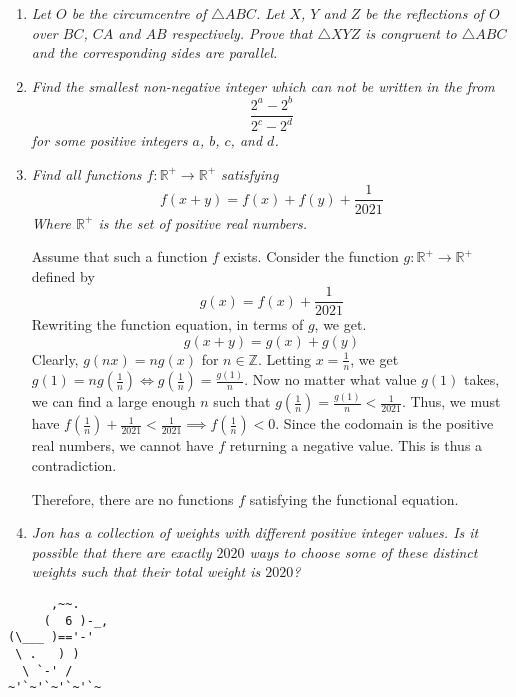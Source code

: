 \documentclass{article}
\begin{document}
\begin{enumerate}[1.]
\item %
{\itshape Let $O$ be the circumcentre of $\triangle ABC$. Let $X$, $Y$ and $Z$ be the reflections of $O$ over $BC$, $CA$ and $AB$ respectively. Prove that $\triangle XYZ$ is congruent to $\triangle ABC$ and the corresponding sides are parallel.}


\item %
{\itshape Find the smallest non-negative integer which can not be written in the from
\[
  \frac{2^a - 2^b}{2^c - 2^d}
\]
for some positive integers $a$, $b$, $c$, and $d$.}


\item %
{\itshape Find all functions $f: \mathbb{R}^+ \rightarrow \mathbb{R}^+$ satisfying 
$$f(x + y) = f(x) + f(y) + \frac{1}{2021} $$
Where $\mathbb{R}^+$ is the set of positive real numbers. }

Assume that such a function $f$ exists. Consider the function $g: \mathbb{R}^+ \rightarrow \mathbb{R}^+$ defined by 
$$g(x) = f(x) + \frac{1}{2021}$$
Rewriting the function equation, in terms of $g$, we get. 
$$g(x + y) = g(x) + g(y)$$
Clearly, $g(nx) = ng(x)$ for $n \in \mathbb{Z}$. Letting $x = \frac{1}{n}$, we get $g(1) = ng(\frac{1}{n}) \iff g(\frac{1}{n}) = \frac{g(1)}{n}$. Now no matter what value $g(1)$ takes, we can find a large enough $n$ such that $g(\frac{1}{n}) = \frac{g(1)}{n} < \frac{1}{2021}$. Thus, we must have $f(\frac{1}{n}) + \frac{1}{2021} < \frac{1}{2021} \implies f(\frac{1}{n}) < 0$. Since the codomain is the positive real numbers, we cannot have $f$ returning a negative value. This is thus a contradiction.

Therefore, there are no functions $f$ satisfying the functional equation.


\item %
{\itshape Jon has a collection of weights with different positive integer values. Is it possible that there are exactly $2020$ ways to choose some of these distinct weights such that their total weight is $2020$?}

\end{enumerate}


\vfill
\centering
\begin{BVerbatim}
      ,~~.
     (  6 )-_,
(\___ )=='-'
 \ .   ) )
  \ `-' /    
~'`~'`~'`~'`~
\end{BVerbatim}
\end{document}
